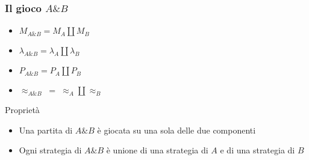 \documentclass{beamer}
\begin{document}
\begin{frame}[t]
	
% 		
% 		
% 				
% 				
% 		
% 		
% 		
% 	
% 	
% 	
% 	
% 	
% 	
% 	
	
	
\end{frame}

\begin{frame}
	
	\frametitle{Il gioco $A \& B$}
	
	\begin{itemize}
		\item $M_{A\& B}=M_A \coprod M_B$
		\item $\lambda_{A\& B}=\lambda_A \coprod \lambda_B$
		\item $P_{A\& B}=P_A \coprod P_B$
		\item $\approx_{A\& B} \; = \; \approx_A \coprod \approx_B$ 
	\end{itemize}
	
	\begin{block}{Proprietà}
		\begin{itemize}
			\item Una partita di $A\& B$ è giocata su una sola delle due componenti
			\item Ogni strategia di $A\& B$ è unione di una strategia di $A$ e di una strategia di $B$
		\end{itemize}
		
	\end{block}
	
\end{frame}
\end{document}
